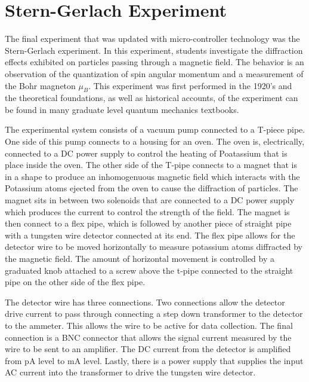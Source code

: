 \section{Stern-Gerlach Experiment}

The final experiment that was updated with micro-controller technology was the Stern-Gerlach experiment.
In this experiment, students investigate the diffraction effects exhibited on particles passing through a magnetic field.
The behavior is an observation of the quantization of spin angular momentum and a measurement of the Bohr magneton $\mu_{B}$.
This experiment was first performed in the 1920's and the theoretical foundations, as well as historical accounts, of the experiment can be found in many graduate level quantum mechanics textbooks.

The experimental system consists of a vacuum pump connected to a T-piece pipe.
One side of this pump connects to a housing for an oven.
The oven is, electrically, connected to a DC power supply to control the heating of Poatassium that is place inside the oven.
The other side of the T-pipe connects to a magnet that is in a shape to produce an inhomogenuous magnetic field which interacts with the Potassium atoms ejected from the oven to cause the diffraction of particles.
The magnet sits in between two solenoids that are connected to a DC power supply which produces the current to control the strength of the field.
The magnet is then connect to a flex pipe, which is followed by another piece of straight pipe with a tungsten wire detector connected at its end.
The flex pipe allows for the detector wire to be moved horizontally to measure potassium atoms diffracted by the magnetic field.
The amount of horizontal movement is controlled by a graduated knob attached to a screw above the t-pipe connected to the straight pipe on the other side of the flex pipe.


The detector wire has three connections.
Two connections allow the detector drive current to pass through connecting a step down transformer to the detector to the ammeter.
This allows the wire to be active for data collection.
The final connection is a BNC connector that allows the signal current measured by the wire to be sent to an amplifier.
The DC current from the detector is amplified from pA level to mA level.
Lastly, there is a power supply that supplies the input AC current into the transformer to drive the tungsten wire detector.

